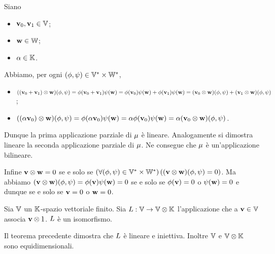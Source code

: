 \Proof Siano
\begin{itemize}
	\item $\mathbf{v}_0, \mathbf{v}_1 \in \mathbb{V}$;
	\item $\mathbf{w} \in \mathbb{W}$;
	\item $\alpha \in \mathbb{K}$.
\end{itemize}
Abbiamo, per ogni $(\phi,\psi) \in {{\mathbb{V}}^*} \times {{\mathbb{W}}^*}$,
\begin{itemize}
	\item $((\mathbf{v}_0 + \mathbf{v}_1) \otimes \mathbf{w})(\phi,\psi) = \phi(\mathbf{v}_0 + \mathbf{v}_1)\psi(\mathbf{w}) = \phi(\mathbf{v}_0)\psi(\mathbf{w}) + \phi(\mathbf{v}_1)\psi(\mathbf{w}) = (\mathbf{v}_0 \otimes \mathbf{w})(\phi,\psi) + (\mathbf{v}_1 \otimes \mathbf{w})(\phi,\psi)$;
	\item $((\alpha\mathbf{v}_0) \otimes \mathbf{w})(\phi,\psi) = \phi(\alpha\mathbf{v}_0)\psi(\mathbf{w}) = \alpha\phi(\mathbf{v}_0)\psi(\mathbf{w}) = \alpha(\mathbf{v}_0 \otimes \mathbf{w})(\phi,\psi)$.
\end{itemize}
Dunque la prima applicazione parziale di $\mu$ \`e lineare. Analogamente si dimostra lineare la seconda applicazione parziale di $\mu$. Ne consegue che $\mu$ \`e un'applicazione bilineare.
\par Infine $\mathbf{v} \otimes \mathbf{w} = 0$ se e solo se $\left ( \forall (\phi,\psi) \in {{\mathbb{V}}^*} \times {{\mathbb{W}}^*} \right ) \left ( (\mathbf{v} \otimes \mathbf{w})(\phi,\psi) = 0 \right )$. Ma abbiamo $(\mathbf{v} \otimes \mathbf{w})(\phi,\psi) = \phi(\mathbf{v})\psi(\mathbf{w}) = 0$ se e solo se $\phi(\mathbf{v}) = 0$ o $\psi(\mathbf{w}) = 0$ e dunque se e solo se $\mathbf{v} = 0$ o $\mathbf{w} = 0$. \EndProof
\begin{Corollary}
	Sia $\mathbb{V}$ un $\mathbb{K}$-spazio vettoriale finito. Sia $L: \mathbb{V} \rightarrow \mathbb{V} \otimes \mathbb{K}$ l'applicazione che a $\mathbf{v} \in \mathbb{V}$ associa $\mathbf{v} \otimes 1$. $L$ \`e un isomorfismo.
\end{Corollary}
\Proof Il teorema precedente dimostra che $L$ \`e lineare e iniettiva. Inoltre $\mathbb{V}$ e $\mathbb{V} \otimes \mathbb{K}$ sono equidimensionali. \EndProof
